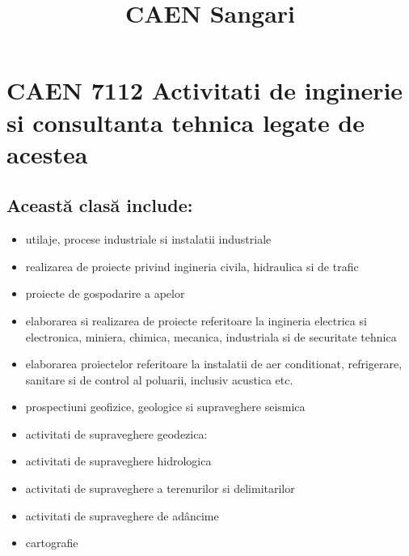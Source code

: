\documentclass{article}
\title{CAEN Sangari}
\begin{document}
\maketitle

\section*{CAEN 7112 Activitati de inginerie si consultanta tehnica legate de acestea}
\subsection*{Această clasă include:}
\begin{itemize}
Activitati de inginerie (adica aplicarea legilor fizice si a principiilor de inginerie în proiectarea masinilor, materialelor, instrumentelor, structurilor, proceselor si sistemelor) si activitati de consultanta pentru:
\item utilaje, procese industriale si instalatii industriale
\item realizarea de proiecte privind ingineria civila, hidraulica si de trafic
\item proiecte de gospodarire a apelor
\item elaborarea si realizarea de proiecte referitoare la ingineria electrica si electronica, miniera, chimica, mecanica, industriala si de securitate tehnica
\item elaborarea proiectelor referitoare la instalatii de aer conditionat, refrigerare, sanitare si de control al poluarii, inclusiv acustica etc.
\item prospectiuni geofizice, geologice si supraveghere seismica
\item activitati de supraveghere geodezica:
\item activitati de supraveghere hidrologica
\item activitati de supraveghere a terenurilor si delimitarilor
\item activitati de supraveghere de adâncime
\item cartografie
\end{itemize}
\end{document}
